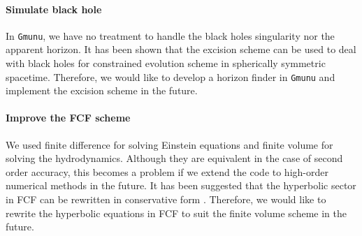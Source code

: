 \paragraph{Simulate black hole}
In \texttt{Gmunu}, we have no treatment to handle the black holes singularity nor the apparent horizon.
It has been shown that \cite{cordero2014excision} the excision scheme can be used to deal with black holes for constrained evolution scheme in spherically symmetric spacetime.
Therefore, we would like to develop a horizon finder in \texttt{Gmunu} and implement the excision scheme in the future.

\paragraph{Improve the FCF scheme}
We used finite difference for solving Einstein equations and finite volume for solving the hydrodynamics.
Although they are equivalent in the case of second order accuracy,
this becomes a problem if we extend the code to high-order numerical methods in the future.
It has been suggested that the hyperbolic sector in FCF can be rewritten in conservative form \cite{cordero2008mathematical}.
Therefore, we would like to rewrite the hyperbolic equations in FCF to suit the finite volume scheme in the future.
